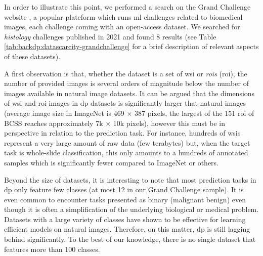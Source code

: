 In order to illustrate this point, we performed a search on the Grand Challenge website \parencite{grandchallange}, a popular plateform which runs \acrlong{ml} challenges related to biomedical images, each challenge coming with an open-access dataset. We searched for \textit{histology} challenges published in 2021 and found 8 results (see Table \ref{tab:backdp:datascarcity-grandchallenge} for a brief description of relevant aspects of these datasets).

A first observation is that, whether the dataset is a set of \acrshort{wsi} or \textit{\acrlong{roi}s} (\acrshort{roi}), the number of provided images is several orders of magnitude below the number of images available in natural image datasets. It can be argued that the dimensions of \acrshort{wsi} and \acrshort{roi} images in \acrlong{dp} datasets is significantly larger that natural images (\eg average image size in ImageNet is 469 $\times$ 387 pixels, the largest of the 151 \acrshort{roi} of BCSS reaches approximately 7k $\times$ 10k pixels), however this must be in perspective in relation to the prediction task. For instance, hundreds of \acrshort{wsi}s represent a very large amount of raw data (\eg few terabytes) but, when the target task is whole-slide classification, this only amounts to a hundreds of annotated samples which is significantly fewer compared to ImageNet or others. 

Beyond the size of datasets, it is interesting to note that most prediction tasks in \acrlong{dp} only feature few classes (at most 12 in our Grand Challenge sample). It is even common to encounter tasks presented as binary (\eg malignant \vs benign) even though it is often a simplification of the underlying biological or medical problem. Datasets with a large variety of classes have shown to be effective for learning efficient models on natural images. Therefore, on this matter, \acrlong{dp} is still lagging behind significantly. To the best of our knowledge, there is no single dataset that features more than 100 classes. 

